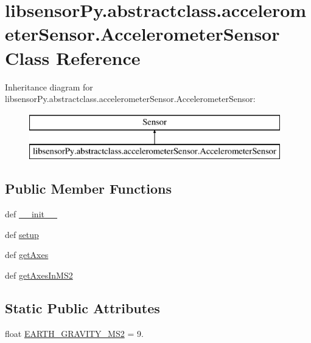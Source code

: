 \hypertarget{classlibsensorPy_1_1abstractclass_1_1accelerometerSensor_1_1AccelerometerSensor}{}\section{libsensor\+Py.\+abstractclass.\+accelerometer\+Sensor.\+Accelerometer\+Sensor Class Reference}
\label{classlibsensorPy_1_1abstractclass_1_1accelerometerSensor_1_1AccelerometerSensor}
Inheritance diagram for libsensor\+Py.\+abstractclass.\+accelerometer\+Sensor.\+Accelerometer\+Sensor\+:\begin{figure}[H]
\begin{center}
\leavevmode
\includegraphics[height=2.000000cm]{classlibsensorPy_1_1abstractclass_1_1accelerometerSensor_1_1AccelerometerSensor}
\end{center}
\end{figure}
\subsection*{Public Member Functions}
\begin{DoxyCompactItemize}
\item 
def \hyperlink{classlibsensorPy_1_1abstractclass_1_1accelerometerSensor_1_1AccelerometerSensor_adcba11ce4a367fb888aeb7d75ae64e91}{\+\_\+\+\_\+init\+\_\+\+\_\+}
\item 
def \hyperlink{classlibsensorPy_1_1abstractclass_1_1accelerometerSensor_1_1AccelerometerSensor_a601afdf9331f27d3ed213ae6aa2950ed}{setup}
\item 
def \hyperlink{classlibsensorPy_1_1abstractclass_1_1accelerometerSensor_1_1AccelerometerSensor_a861a70bc175c932176ab0927a6c1cf5c}{get\+Axes}
\item 
def \hyperlink{classlibsensorPy_1_1abstractclass_1_1accelerometerSensor_1_1AccelerometerSensor_a7816b039845c990d6d479d4b830cf91d}{get\+Axes\+In\+M\+S2}
\end{DoxyCompactItemize}
\subsection*{Static Public Attributes}
\begin{DoxyCompactItemize}
\item 
float \hyperlink{classlibsensorPy_1_1abstractclass_1_1accelerometerSensor_1_1AccelerometerSensor_a7446d06643573657d74bae7516f2162e}{E\+A\+R\+T\+H\+\_\+\+G\+R\+A\+V\+I\+T\+Y\+\_\+\+M\+S2} = 9.
\end{DoxyCompactItemize}
